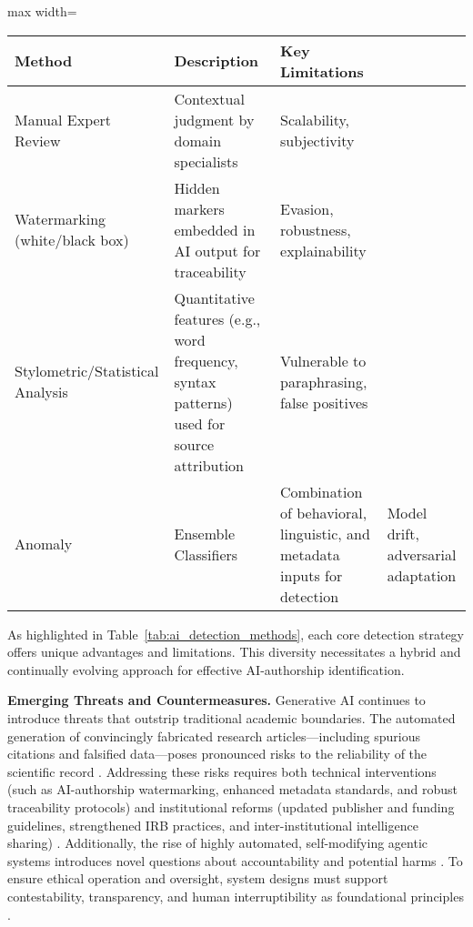 \documentclass[sigconf]{acmart}
\begin{document}
\begin{table*}[htbp]
\centering
\caption{Core Detection Approaches for AI-Generated Academic Content}
\label{tab:ai_detection_methods}
\begin{adjustbox}{max width=\textwidth}
\begin{tabular}{@{}llll@{}}
\toprule
\textbf{Method} & \textbf{Description} & \textbf{Key Limitations} &  \\
\midrule
Manual Expert Review & Contextual judgment by domain specialists & Scalability, subjectivity &  \\
Watermarking (white/black box) & Hidden markers embedded in AI output for traceability & Evasion, robustness, explainability &  \\
Stylometric/Statistical Analysis & Quantitative features (e.g., word frequency, syntax patterns) used for source attribution & Vulnerable to paraphrasing, false positives &  \\
Anomaly & Ensemble Classifiers & Combination of behavioral, linguistic, and metadata inputs for detection & Model drift, adversarial adaptation \\
\bottomrule
\end{tabular}
\end{adjustbox}
\end{table*}

As highlighted in Table~\ref{tab:ai_detection_methods}, each core detection strategy offers unique advantages and limitations. This diversity necessitates a hybrid and continually evolving approach for effective AI-authorship identification.

\textbf{Emerging Threats and Countermeasures.}
Generative AI continues to introduce threats that outstrip traditional academic boundaries. The automated generation of convincingly fabricated research articles—including spurious citations and falsified data—poses pronounced risks to the reliability of the scientific record \cite{ref2,ref39,ref92,ref93,ref95,ref97,ref98}. Addressing these risks requires both technical interventions (such as AI-authorship watermarking, enhanced metadata standards, and robust traceability protocols) \cite{ref53,ref86,ref91,ref97,ref98,ref100} and institutional reforms (updated publisher and funding guidelines, strengthened IRB practices, and inter-institutional intelligence sharing) \cite{ref4,ref9,ref41,ref66,ref84,ref95,ref110}. Additionally, the rise of highly automated, self-modifying agentic systems introduces novel questions about accountability and potential harms \cite{ref9,ref37,ref38,ref39,ref61,ref66,ref95,ref106}. To ensure ethical operation and oversight, system designs must support contestability, transparency, and human interruptibility as foundational principles \cite{ref61,ref64,ref95,ref110}.
\end{document}
